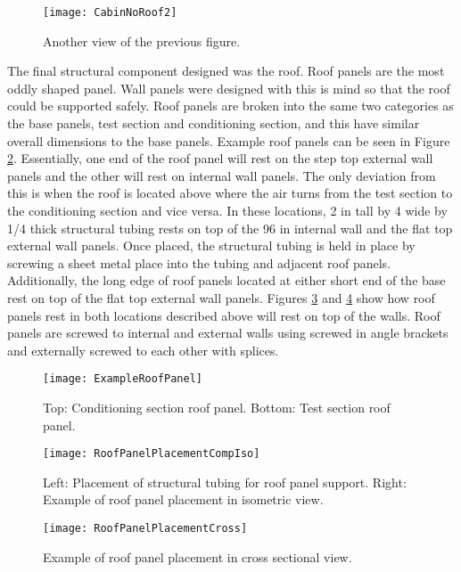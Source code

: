 \begin{figure} [h!]
\centering
\texttt{[image: CabinNoRoof2]}
\caption{Another view of the previous figure.}
\label{fig:CabinNoRoof2}
\end{figure}

\FloatBarrier

The final structural component designed was the roof. Roof panels are the most oddly shaped panel. Wall panels were designed with this is mind so that the roof could be supported safely. Roof panels are broken into the same two categories as the base panels, test section and conditioning section, and this have similar overall dimensions to the base panels. Example roof panels can be seen in Figure \ref{fig:ExampleRoofPanel}. Essentially, one end of the roof panel will rest on the step top external wall panels and the other will rest on internal wall panels. The only deviation from this is when the roof is located above where the air turns from the test section to the conditioning section and vice versa. In these locations, 2 in tall by 4 wide by 1/4 thick structural tubing rests on top of the 96 in internal wall and the flat top external wall panels. Once placed, the structural tubing is held in place by screwing a sheet metal place into the tubing and adjacent roof panels. Additionally, the long edge of roof panels located at either short end of the base rest on top of the flat top external wall panels. Figures \ref{fig:RoofPanelPlacementCompIso} and \ref{fig:RoofPanelPlacementCross} show how roof panels rest in both locations described above will rest on top of the walls. 
Roof panels are screwed to internal and external walls using screwed in angle brackets and externally screwed to each other with splices. 
\begin{figure} [h!]
\centering
\texttt{[image: ExampleRoofPanel]}
\caption{Top: Conditioning section roof panel. Bottom: Test section roof panel.}
\label{fig:ExampleRoofPanel}
\end{figure}

\begin{figure} [h!]
\centering
\texttt{[image: RoofPanelPlacementCompIso]}
\caption{Left: Placement of structural tubing for roof panel support. Right: Example of roof panel placement in isometric view.}
\label{fig:RoofPanelPlacementCompIso}
\end{figure}

\begin{figure} [h!]
\centering
\texttt{[image: RoofPanelPlacementCross]}
\caption{Example of roof panel placement in cross sectional view.}
\label{fig:RoofPanelPlacementCross}
\end{figure}

